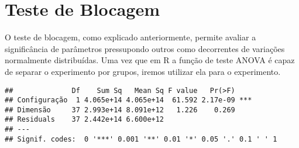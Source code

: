 \documentclass[
]{article}
\newenvironment{Shaded}{\begin{snugshade}}{\end{snugshade}}
\newcommand{\AttributeTok}[1]{\textcolor[rgb]{0.77,0.63,0.00}{#1}}
\newcommand{\FunctionTok}[1]{\textcolor[rgb]{0.00,0.00,0.00}{#1}}
\newcommand{\NormalTok}[1]{#1}
\newcommand{\OtherTok}[1]{\textcolor[rgb]{0.56,0.35,0.01}{#1}}
\newcommand{\SpecialCharTok}[1]{\textcolor[rgb]{0.00,0.00,0.00}{#1}}
\newcommand{\StringTok}[1]{\textcolor[rgb]{0.31,0.60,0.02}{#1}}
\begin{document}
\hypertarget{teste-de-blocagem}{%
\section{Teste de Blocagem}\label{teste-de-blocagem}}

O teste de blocagem, como explicado anteriormente, permite avaliar a
significância de parâmetros pressupondo outros como decorrentes de
variações normalmente distribuídas. Uma vez que em R a função de teste
ANOVA é capaz de separar o experimento por grupos, iremos utilizar ela
para o experimento.

\begin{Shaded}
\end{Shaded}

\begin{verbatim}
##              Df    Sum Sq   Mean Sq F value   Pr(>F)    
## Configuração  1 4.065e+14 4.065e+14  61.592 2.17e-09 ***
## Dimensão     37 2.993e+14 8.091e+12   1.226    0.269    
## Residuals    37 2.442e+14 6.600e+12                     
## ---
## Signif. codes:  0 '***' 0.001 '**' 0.01 '*' 0.05 '.' 0.1 ' ' 1
\end{verbatim}

\begin{Shaded}
\end{Shaded}
\end{document}

